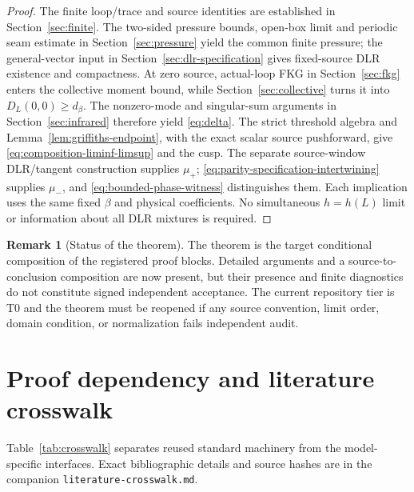 \documentclass[11pt]{article}
\numberwithin{equation}{section}
\theoremstyle{definition}
\newtheorem{remark}[theorem]{Remark}
\begin{document}
\begin{proof}
The finite loop/trace and source identities are established in
Section~\ref{sec:finite}.  The two-sided pressure bounds, open-box limit
and periodic seam estimate in Section~\ref{sec:pressure} yield the common
finite pressure; the general-vector input in
Section~\ref{sec:dlr-specification} gives fixed-source DLR existence and
compactness.  At zero source, actual-loop FKG in Section~\ref{sec:fkg}
enters the collective moment bound, while Section~\ref{sec:collective}
turns it into $D_L(0,0)\geq d_\beta$.  The nonzero-mode and singular-sum
arguments in Section~\ref{sec:infrared} therefore yield
\eqref{eq:delta}.  The strict threshold algebra and
Lemma~\ref{lem:griffiths-endpoint}, with the exact scalar source
pushforward, give \eqref{eq:composition-liminf-limsup} and the cusp.
The separate source-window DLR/tangent construction supplies $\mu_+$;
\eqref{eq:parity-specification-intertwining} supplies $\mu_-$, and
\eqref{eq:bounded-phase-witness} distinguishes them.  Each implication uses
the same fixed $\beta$ and physical coefficients.  No simultaneous
$h=h(L)$ limit or information about all DLR mixtures is required.
\end{proof}

\begin{remark}[Status of the theorem]
The theorem is the target conditional composition of the registered proof
blocks. Detailed arguments and a source-to-conclusion composition are now
present, but their presence and finite diagnostics do not constitute signed
independent acceptance. The current repository tier is T0 and the theorem must be
reopened if any source convention, limit order, domain condition, or
normalization fails independent audit.
\end{remark}

\section{Proof dependency and literature crosswalk}
\label{sec:crosswalk}

Table~\ref{tab:crosswalk} separates reused standard machinery from the
model-specific interfaces.  Exact bibliographic details and source hashes are
in the companion \texttt{literature-crosswalk.md}.
\end{document}
